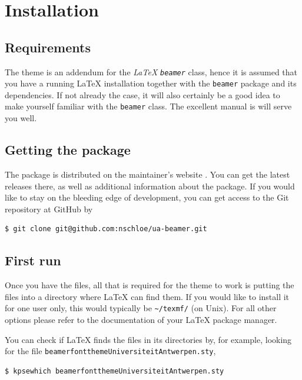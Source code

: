 \section{Installation}

\subsection{Requirements}
The theme is an addendum for the \emph{\LaTeX} \emph{\texttt{beamer}} class,
hence it is assumed that you have a running \LaTeX{} installation together with
the \texttt{beamer} package \cite{Miletic:2010:LBC} and its dependencies. If
not already the case, it will also certainly be a good idea to make yourself
familiar with the \texttt{beamer} class. The excellent manual
\cite{TWM:2010:BCU} is will serve you well.

\subsection{Getting the package}

The package is distributed on the maintainer's website
\cite{Schloemer:2011:website}. You can get the latest releases there, as well
as additional information about the package. If you would like to stay on the
bleeding edge of development, you can get access to the Git  repository at
GitHub \cite{GitHub:2011:uabeamer} by
\begin{lstlisting}
$ git clone git@github.com:nschloe/ua-beamer.git
\end{lstlisting}


\subsection{First run}
Once you have the files, all that is required for the theme to work is putting
the files into a directory where \LaTeX{} can find them. If you would like to
install it for one user only, this would typically be \lstinline{~/texmf/} (on
Unix). For all other options please refer to the documentation of your \LaTeX{}
package manager.

You can check if \LaTeX{} finds the files in its directories by, for example,
looking for the file \lstinline!beamerfontthemeUniversiteitAntwerpen.sty!,
\begin{lstlisting}
$ kpsewhich beamerfontthemeUniversiteitAntwerpen.sty
\end{lstlisting}

